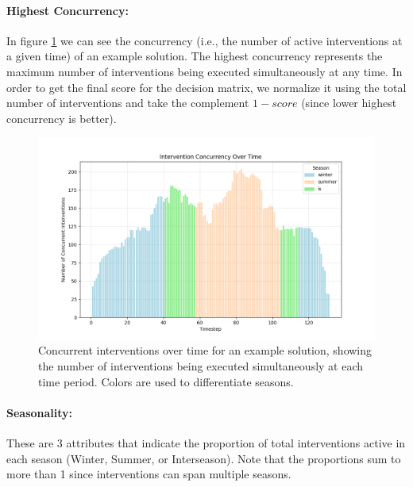 \paragraph{Highest Concurrency:} In figure \ref{fig:concurrency} we can see the concurrency (i.e., the number of active interventions at a given time) of an example solution. The highest concurrency represents the maximum number of interventions being executed simultaneously at any time. In order to get the final score for the decision matrix, we normalize it using the total number of interventions and take the complement $1-score$ (since lower highest concurrency is better).

\begin{figure}[ht]
    \centering
    \includegraphics[width=\textwidth]{ch3/figures/Concurrency.png}
    \caption{Concurrent interventions over time for an example solution, showing the number of interventions being executed simultaneously at each time period. Colors are used to differentiate seasons.}
    \label{fig:concurrency}
\end{figure}







\paragraph{Seasonality:} These are 3 attributes that indicate the proportion of total interventions active in each season (Winter, Summer, or Interseason). Note that the proportions sum to more than 1 since interventions can span multiple seasons.